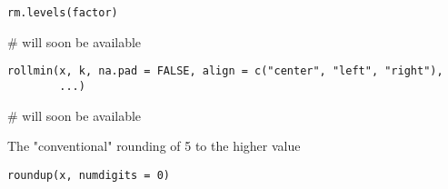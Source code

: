 \documentclass[a4paper]{book}
\begin{document}
%
\begin{Usage}
\begin{verbatim}
rm.levels(factor)
\end{verbatim}
\end{Usage}
%
\begin{Arguments}
\begin{ldescription}
\item[\code{factor}] 


\end{ldescription}
\end{Arguments}
%
\begin{Examples}
\begin{ExampleCode}
# will soon be available
\end{ExampleCode}
\end{Examples}
\newpage
{}
%
\begin{Usage}
\begin{verbatim}
rollmin(x, k, na.pad = FALSE, align = c("center", "left", "right"),
        ...)
\end{verbatim}
\end{Usage}
%
\begin{Arguments}
\begin{ldescription}
\item[\code{x}] 


\item[\code{k}] 


\item[\code{na.pad}] 


\item[\code{align}] 


\item[\code{...}] 


\end{ldescription}
\end{Arguments}
%
\begin{Examples}
\begin{ExampleCode}
# will soon be available
\end{ExampleCode}
\end{Examples}
\newpage
{}
%
\begin{Description}\relax
The "conventional" rounding of 5 to the higher value
\end{Description}
%
\begin{Usage}
\begin{verbatim}
roundup(x, numdigits = 0)
\end{verbatim}
\end{Usage}
\end{document}
